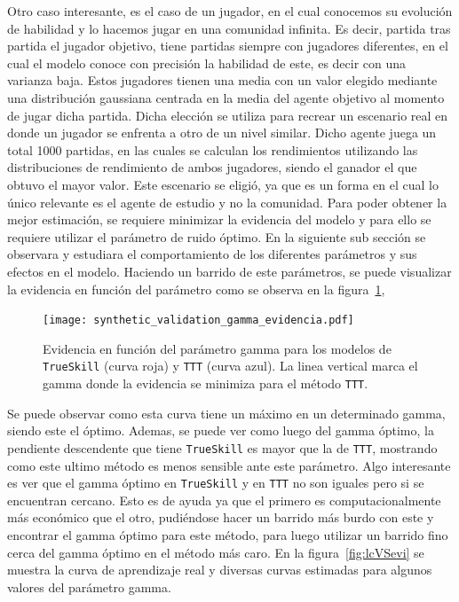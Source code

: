 \documentclass[11pt,twoside, spanish]{report} %
\begin{document}
Otro caso interesante, es el caso de un jugador, en el cual conocemos su evoluci\'on de habilidad y lo hacemos jugar en una comunidad infinita.
Es decir, partida tras partida el jugador objetivo, tiene partidas siempre con jugadores diferentes, en el cual el modelo conoce con precisi\'on la habilidad de este, es decir con una varianza baja.
Estos jugadores tienen una media con un valor elegido mediante una distribuci\'on gaussiana centrada en la media del agente objetivo al momento de jugar dicha partida.
Dicha elecci\'on se utiliza para recrear un escenario real en donde un jugador se enfrenta a otro de un nivel similar.
Dicho agente juega un total 1000 partidas, en las cuales se calculan los rendimientos utilizando las distribuciones de rendimiento de ambos jugadores, siendo el ganador el que obtuvo el mayor valor.
Este escenario se eligi\'o, ya que es un forma en el cual lo \'unico relevante es el agente de estudio y no la comunidad.
Para poder obtener la mejor estimaci\'on, se requiere minimizar la evidencia del modelo y para ello se requiere utilizar el par\'ametro de ruido \'optimo.
En la siguiente sub secci\'on se observara y estudiara el comportamiento de los diferentes par\'ametros y sus efectos en el modelo.
Haciendo un barrido de este par\'ametros, se puede visualizar la evidencia en funci\'on del par\'ametro como se observa en la figura~\ref{fig:gammaVSev},

\begin{figure}[H]
	\centering
	\texttt{[image: synthetic\_validation\_gamma\_evidencia.pdf]}
	\caption{Evidencia en funci\'on del par\'ametro gamma para los modelos de \texttt{TrueSkill} (curva roja) y \texttt{TTT} (curva azul). La linea vertical marca el gamma donde la evidencia se minimiza para el m\'etodo \texttt{TTT}.}
	\label{fig:gammaVSev}
\end{figure}

Se puede observar como esta curva tiene un m\'aximo en un determinado gamma, siendo este el \'optimo.
Ademas, se puede ver como luego del gamma \'optimo, la pendiente descendente que tiene \texttt{TrueSkill} es mayor que la de \texttt{TTT}, mostrando como este ultimo m\'etodo es menos sensible ante este par\'ametro.
Algo interesante es ver que el gamma \'optimo en \texttt{TrueSkill} y en \texttt{TTT} no son iguales pero si se encuentran cercano.
Esto es de ayuda ya que el primero es computacionalmente m\'as econ\'omico que el otro, pudi\'endose hacer un barrido m\'as burdo con este y encontrar el gamma \'optimo para este m\'etodo, para luego utilizar un barrido fino cerca del gamma \'optimo en el m\'etodo m\'as caro.
En la figura~\ref{fig:lcVSevi} se muestra la curva de aprendizaje real y diversas curvas estimadas para algunos valores del par\'ametro gamma.
\end{document}
